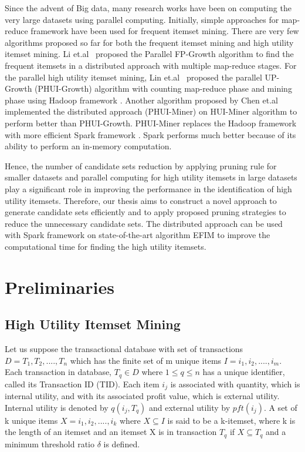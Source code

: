 \documentclass[11pt,openright]{report}
\begin{document}
Since the advent of Big data, many research works have been on computing the very large datasets using parallel computing. Initially, simple approaches for map-reduce framework have been used for frequent itemset mining\cite{Yang2010,Cryans2010}. There are very few algorithms proposed so far for both the frequent itemset mining and high utility itemset mining. Li et.al~\cite{Li2008} proposed the Parallel FP-Growth algorithm to find the frequent itemsets in a distributed approach with multiple map-reduce stages. For the parallel high utility itemset mining, Lin et.al~\cite{Lin2015} proposed the parallel UP-Growth (PHUI-Growth) algorithm with counting map-reduce phase and mining phase using Hadoop framework \cite{Dean2008}. Another algorithm proposed by Chen et.al~\cite{Chen2016} implemented the distributed approach (PHUI-Miner) on HUI-Miner algorithm \cite{Liu2012} to perform better than PHUI-Growth. PHUI-Miner replaces the Hadoop framework \cite{Dean2008} with more efficient Spark framework \cite{Zaharia2010}. Spark performs much better because of its ability to perform an in-memory computation.

Hence, the number of candidate sets reduction by applying pruning rule for smaller datasets and parallel computing for high utility itemsets in large datasets play a significant role in improving the performance in the identification of high utility itemsets. Therefore, our thesis aims to construct a novel approach to generate candidate sets efficiently and to apply proposed pruning strategies to reduce the unnecessary candidate sets. The distributed approach can be used with Spark framework on state-of-the-art algorithm EFIM \cite{Zida2015} to improve the computational time for finding the high utility itemsets.


\section{Preliminaries}\label{section:preliminaries}
\subsection{High Utility Itemset Mining}
Let us suppose the transactional database with set of transactions $D = {T_1, T_2, ...., T_n}$ which has the finite set of m unique items $I = {i_1, i_2, ...., i_m}$. Each transaction in database, $T_q \in D$ where $1 \leq q \leq n$ has a unique identifier, called its Transaction ID (TID). Each item $i_j$ is associated with quantity, which is internal utility, and with its associated profit value, which is external utility. Internal utility is denoted by $q(i_j, T_q)$ and external utility by $pft(i_j)$. A set of k unique items $X = {i_1, i_2, ...., i_k}$ where $X \subseteq I$ is said to be a k-itemset, where k is the length of an itemset and an itemset X is in transaction $T_q$ if $X \subseteq T_q$ and a minimum threshold ratio $\delta$ is defined.
\end{document}
